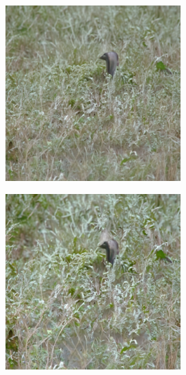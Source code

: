 \documentclass{article}
\begin{document}
\begin{figure}
    \begin{subfigure}[b]{0.19\linewidth}
    \includegraphics[width=\linewidth]{figures/imagenet256/solver_samples/imagenet256_fm_ot_06_05.png}
    \end{subfigure}
    \begin{subfigure}[b]{0.19\linewidth}
    \includegraphics[width=\linewidth]{figures/imagenet256/solver_samples/imagenet256_fm_ot_06_10.png}

\end{subfigure}
\end{figure}
\end{document}
